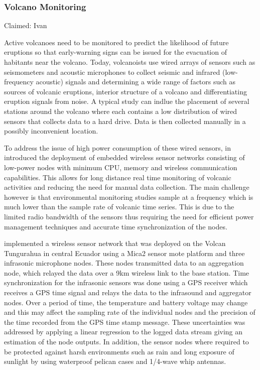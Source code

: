 \subsubsection{Volcano Monitoring}
Claimed: Ivan

Active volcanoes need to be monitored to predict the likelihood of future eruptions so that early-warning signs can be issued for the evacuation of habitants near the volcano. Today, volcanoists use wired arrays of sensors such as seismometers and acoustic microphones to collect seismic and infrared (low-frequency acoustic) signals and determining a wide range of factors such as sources of volcanic eruptions, interior structure of a volcano and differentiating eruption signals from noise. A typical study can indlue the placement of several stations around the volcano where each contains a low distribution of wired sensors that collects data to a hard drive. Data is then collected manually in a possibly inconvenient location.

To address the issue of high power consumption of these wired sensors, \citeauthor{Werner-Allen:2006:FYV:1298455.1298491} in \cite{Werner-Allen:2006:FYV:1298455.1298491} introduced the deployment of embedded wireless sensor networks consisting of low-power nodes with minimum CPU, memory and wireless communication capabilities. This allows for long distance real time monitoring of volcanic activities and reducing the need for manual data collection. The main challenge however is that environmental monitoring studies sample at a frequency which is much lower than the sample rate of volcanic time series. This is due to the limited radio bandwidth of the sensors thus requiring the need for efficient power management techniques and accurate time synchronization of the nodes. 

\citeauthor{Werner-Allen:2006:FYV:1298455.1298491} implemented a wireless sensor network that was deployed on the Volcan Tungurahua in central Ecuador using a Mica2 sensor mote platform and three infrasonic microphone nodes. These nodes transmitted data to an aggregation node, which relayed the data over a 9km wireless link to the base station. Time synchronization for the infrasonic sensors was done using a GPS receiver which receives a GPS time signal and relays the data 
to the infrasound and aggregator nodes. Over a period of time, the temperature and battery voltage may change and this may affect the sampling rate of the individual nodes and the precision of the time recorded from the GPS time stamp message. These uncertainties was addressed by applying a linear regression to the logged data stream giving an estimation of the node outputs. In addition, the sensor nodes where required to be protected against harsh environments such as rain and long exposure of sunlight by using waterproof pelican cases and 1/4-wave whip antennas.

